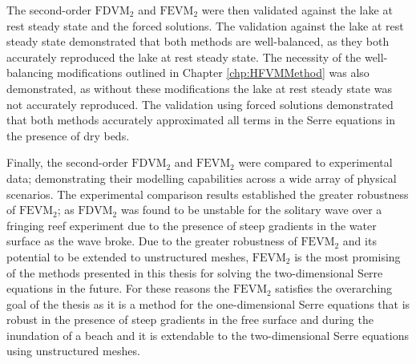 The second-order $\text{FDVM}_2$ and $\text{FEVM}_2$ were then validated against the lake at rest steady state and the forced solutions. The validation against the lake at rest steady state demonstrated that both methods are well-balanced, as they both accurately reproduced the lake at rest steady state. The necessity of the well-balancing modifications outlined in Chapter \ref{chp:HFVMMethod} was also demonstrated, as without these modifications the lake at rest steady state was not accurately reproduced. The validation using forced solutions demonstrated that both methods accurately approximated all terms in the Serre equations in the presence of dry beds. 

Finally, the second-order $\text{FDVM}_2$ and $\text{FEVM}_2$ were compared to experimental data; demonstrating their modelling capabilities across a wide array of physical scenarios. The experimental comparison results established the greater robustness of $\text{FEVM}_2$; as $\text{FDVM}_2$ was found to be unstable for the solitary wave over a fringing reef experiment due to the presence of steep gradients in the water surface as the wave broke. Due to the greater robustness of $\text{FEVM}_2$ and its potential to be extended to unstructured meshes, $\text{FEVM}_2$ is the most promising of the methods presented in this thesis for solving the two-dimensional Serre equations in the future. For these reasons the $\text{FEVM}_2$ satisfies the overarching goal of the thesis as it is a method for the one-dimensional Serre equations that is robust in the presence of steep gradients in the free surface and during the inundation of a beach and it is extendable to the two-dimensional Serre equations using unstructured meshes.

